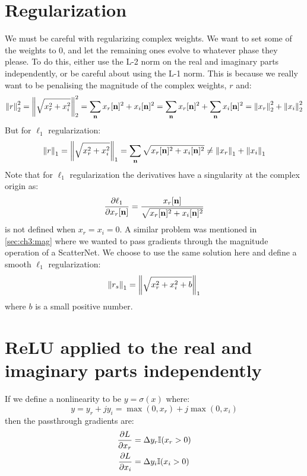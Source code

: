 \section{Regularization}\label{sec:appE:complex_reg}
We must be careful with regularizing complex weights. We want to set some
of the weights to 0, and let the remaining ones evolve to whatever phase they
please. To do this, either use the L-2 norm on the real and imaginary parts
independently, or be careful about using the L-1 norm. This is because we
really want to be penalising the magnitude of the complex weights, $r$ and: 
\begin{equation}
  {\left\lVert r \right\rVert}_{2}^2 = {\left\lVert \sqrt{x_r^2+x_i^2} \right\rVert}_{2}^2 = \sum_{\mathbf{n}} x_r[\mathbf{n}]^2 + x_i[\mathbf{n}]^2 = 
  \sum_{\mathbf{n}} x_r[\mathbf{n}]^2 + \sum_{\mathbf{n}} x_i[\mathbf{n}]^2 = {\left\lVert x_r \right\rVert}_{2}^2 + {\left\lVert x_i \right\rVert}_{2}^2
\end{equation}
But for $\ell_1$ regularization:
\begin{equation}
  {\left\lVert r \right\rVert}_{1} = {\left\lVert \sqrt{x_r^2+x_i^2} \right\rVert}_{1} = \sum_{\mathbf{n}} \sqrt{x_r[\mathbf{n}]^2 + x_i[\mathbf{n}]^2} \neq {\left\lVert x_r \right\rVert}_{1} + {\left\lVert x_i \right\rVert}_{1}
\end{equation}
Note that for $\ell_1$ regularization the derivatives have a singularity at the complex
origin as:
\begin{equation}
  \frac{\partial \ell_1}{\partial x_r[\mathbf{n}]} = \frac{x_r[\mathbf{n}]}{\sqrt{x_r[\mathbf{n}]^2 + x_i[\mathbf{n}]^2}}
\end{equation}
is not defined when $x_r=x_i=0$. A similar problem was mentioned in \autoref{sec:ch3:mag}
where we wanted to pass gradients through the magnitude operation of a
ScatterNet. We choose to use the same solution here and define a smooth $\ell_1$
regularization:
\begin{equation}
  {\left\lVert r_s \right\rVert}_{1} = {\left\lVert \sqrt{x_r^2+x_i^2 + b} \right\rVert}_{1}
\end{equation}
where $b$ is a small positive number.

\section{ReLU applied to the real and imaginary parts independently}\label{sec:appE:complex_relu}
If we define a nonlinearity to be $y = \sigma(x)$ where:
\begin{equation}
  y = y_r + jy_i = \max(0, x_r) + j\max(0, x_i)
\end{equation}
then the passthrough gradients are:
\begin{align}
  \frac{\partial L}{\partial x_r} &= \Delta y_r \mathbb{I}(x_r > 0)\\
  \frac{\partial L}{\partial x_i} &= \Delta y_i \mathbb{I}(x_i > 0)
\end{align}

